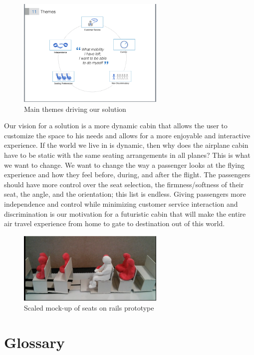 \documentclass[a4paper, 12pt,conference]{new_cit_thesis}
\begin{document}
\begin{figure}[h]
  \centering
     \includegraphics[width=7cm]{images/image007.png}
   \caption{Main themes driving our solution}
  \label{fig:main_themes}
\end{figure}

Our vision for a solution is a more dynamic cabin that allows the user to customize the space to his needs and allows for a more enjoyable and interactive experience.  If the world we live in is dynamic, then why does the airplane cabin have to be static with the same seating arrangements in all planes?  This is what we want to change.  We want to change the way a passenger looks at the flying experience and how they feel before, during, and after the flight.  The passengers should have more control over the seat selection, the firmness/softness of their seat, the angle, and the orientation; this list is endless. Giving passengers more independence and control while minimizing customer service interaction and discrimination is our motivation for a futuristic cabin that will make the entire air travel experience from home to gate to destination out of this world.

\begin{figure}[h]
  \centering
     \includegraphics[width=7cm]{images/image008.png}
   \caption{Scaled mock-up of seats on rails prototype}
  \label{fig:mock_up_on_rails}
\end{figure}


\section*{Glossary}
\end{document}
